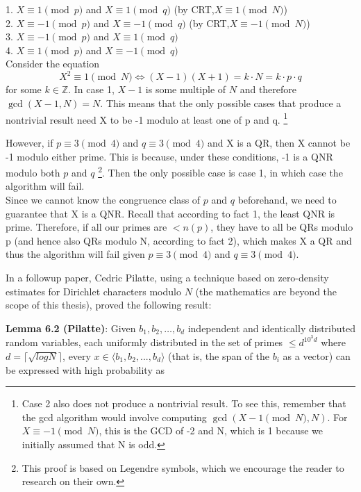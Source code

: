1. $X \equiv 1 \pmod p$ and $X \equiv 1 \pmod q$ (by CRT,$X \equiv 1 \pmod N$)\\
2. $X \equiv -1 \pmod p$ and $X \equiv -1 \pmod q$ (by CRT,$X \equiv -1 \pmod N$)\\
3. $X \equiv -1 \pmod p$ and $X \equiv 1 \pmod q$\\
4. $X \equiv 1 \pmod p$ and $X \equiv -1 \pmod q$\\

Consider the equation $$X^2 \equiv 1 \pmod N \iff (X-1)(X+1) = k \cdot N = k \cdot p \cdot q$$ for some $k \in \mathbb{Z}$. In case 1, $X-1$ is some multiple of $N$ and therefore $\gcd(X-1,N) = N$. This means that the only possible cases that produce a nontrivial result need X to be -1 modulo at least one of p and q. \nopagebreak\footnote{Case 2 also does not produce a nontrivial result. To see this, remember that the gcd algorithm would involve computing $\gcd(X-1 \pmod N,N)$. For $X \equiv -1 \pmod N$, this is the GCD of -2 and N, which is 1 because we initially assumed that N is odd.}

However, if $p \equiv 3 \pmod 4$ and $q \equiv 3 \pmod 4$ and X is a QR, then X cannot be -1 modulo either prime. This is because, under these conditions, -1 is a QNR modulo both $p$ and $q$ \footnote{This proof is based on Legendre symbols, which we encourage the reader to research on their own.}. Then the only possible case is case 1, in which case the algorithm will fail. \\
Since we cannot know the congruence class of $p$ and $q$ beforehand, we need to guarantee that X is a QNR. Recall that according to fact 1, the least QNR is prime. Therefore, if all our primes are  $< n(p)$, they have to all be QRs modulo p (and hence also QRs modulo N, according to fact 2), which makes X a QR and thus the algorithm will fail given $p \equiv 3 \pmod 4$ and $q \equiv 3 \pmod 4$.

In a followup paper, Cedric Pilatte\cite{Pilatte2024}, using a technique based on zero-density estimates for Dirichlet characters modulo $N$ (the mathematics are beyond the scope of this thesis), proved the following result:

\textbf{Lemma 6.2 (Pilatte)}:
Given $b_1,b_2,\dots,b_d$ independent and identically distributed random variables, each uniformly distributed in the set of primes $\leq d^{10^{3}d}$ where $d = \lceil\sqrt{logN} \rceil$, every $x \in \langle b_1,b_2,...,b_d\rangle $ (that is, the span of the $b_i$ as a vector) can be expressed with high probability as

